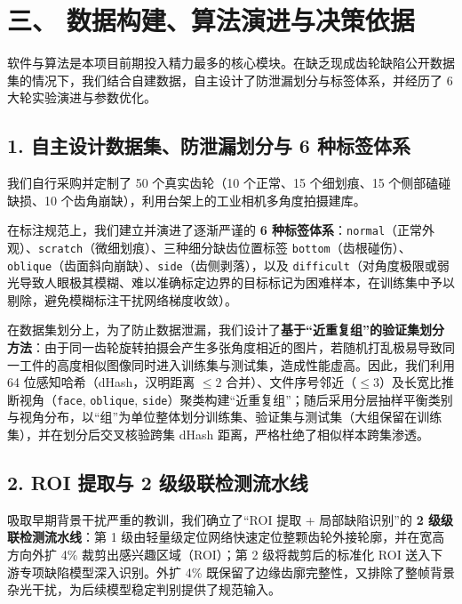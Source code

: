 \section*{三、 数据构建、算法演进与决策依据}

软件与算法是本项目前期投入精力最多的核心模块。在缺乏现成齿轮缺陷公开数据集的情况下，我们结合自建数据，自主设计了防泄漏划分与标签体系，并经历了 6 大轮实验演进与参数优化。

\subsection*{1. 自主设计数据集、防泄漏划分与 6 种标签体系}
我们自行采购并定制了 50 个真实齿轮（10 个正常、15 个细划痕、15 个侧部磕碰缺损、10 个齿角崩缺），利用台架上的工业相机多角度拍摄建库。

在标注规范上，我们建立并演进了逐渐严谨的 \textbf{6 种标签体系}：\texttt{normal}（正常外观）、\texttt{scratch}（微细划痕）、三种细分缺齿位置标签 \texttt{bottom}（齿根碰伤）、\texttt{oblique}（齿面斜向崩缺）、\texttt{side}（齿侧剥落），以及 \texttt{difficult}（对角度极限或弱光导致人眼极其模糊、难以准确标定边界的目标标记为困难样本，在训练集中予以剔除，避免模糊标注干扰网络梯度收敛）。

在数据集划分上，为了防止数据泄漏，我们设计了\textbf{基于“近重复组”的验证集划分方法}：由于同一齿轮旋转拍摄会产生多张角度相近的图片，若随机打乱极易导致同一工件的高度相似图像同时进入训练集与测试集，造成性能虚高。因此，我们利用 64 位感知哈希（dHash，汉明距离 $\le 2$ 合并）、文件序号邻近（$\le 3$）及长宽比推断视角（\texttt{face}, \texttt{oblique}, \texttt{side}）聚类构建“近重复组”；随后采用分层抽样平衡类别与视角分布，以“组”为单位整体划分训练集、验证集与测试集（大组保留在训练集），并在划分后交叉核验跨集 dHash 距离，严格杜绝了相似样本跨集渗透。

\subsection*{2. ROI 提取与 2 级级联检测流水线}
吸取早期背景干扰严重的教训，我们确立了“ROI 提取 + 局部缺陷识别”的 \textbf{2 级级联检测流水线}：第 1 级由轻量级定位网络快速定位整颗齿轮外接轮廓，并在宽高方向外扩 4\% 裁剪出感兴趣区域（ROI）；第 2 级将裁剪后的标准化 ROI 送入下游专项缺陷模型深入识别。外扩 4\% 既保留了边缘齿廓完整性，又排除了整帧背景杂光干扰，为后续模型稳定判别提供了规范输入。

